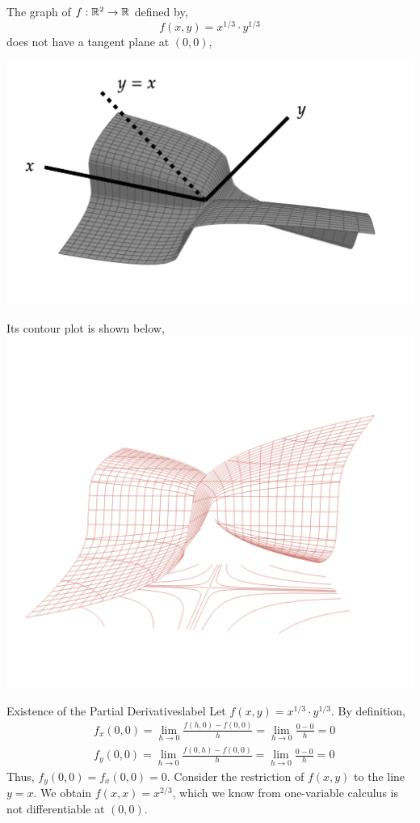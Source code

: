 \begin{marginfigure}
    The graph of $f: \mathbb{R}^2 \rightarrow \mathbb{R}$ defined by,
        \[f(x, y) = x^{1/3} \cdot y^{1/3}\]
    does not have a tangent plane at $(0,0)$,
    \begin{center}
       \includegraphics[width=\textwidth]{figures/wk-2/case-study.png}
    \end{center}
    Its contour plot is shown below, 
    \includegraphics[width=0.8\linewidth]{figures/wk-2/fig-23.png}
\end{marginfigure}

\begin{ex}{Existence of the Partial Derivatives}{label}
    Let $f(x, y) = x^{1/3} \cdot y^{1/3}$. By definition,
    \begin{align*}
        &f_x(0,0)=\lim_{h \rightarrow 0} \frac{f(h, 0)-f(0,0)}{h}=\lim_{h \rightarrow 0} \frac{0-0}{h}=0 \\
        &f_y(0,0)=\lim_{h \rightarrow 0} \frac{f(0, h)-f(0,0)}{h}=\lim_{h \rightarrow 0} \frac{0-0}{h}=0
    \end{align*}
    Thus, $f_y(0,0) = f_x(0,0) = 0$. Consider the restriction of $f(x, y)$ to the line $y = x$. We obtain $f(x, x) = x^{2/3}$, which we know from one-variable calculus is not differentiable at $(0,0)$.
\end{ex}

